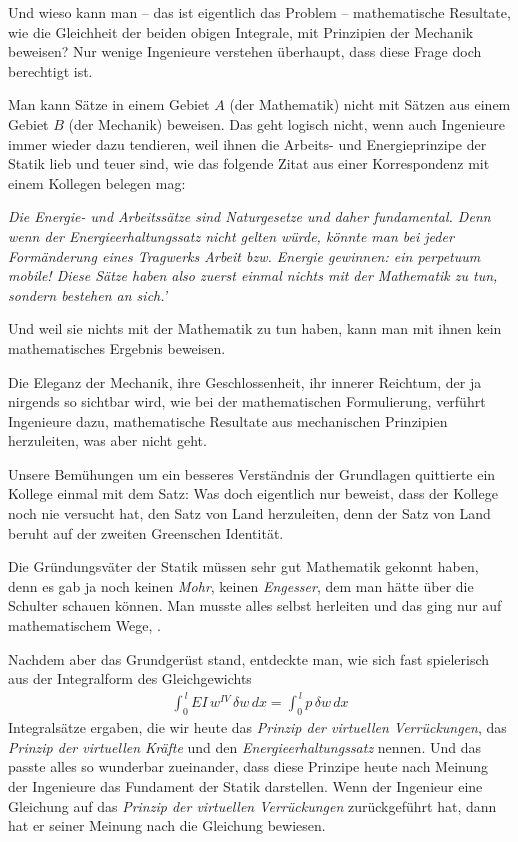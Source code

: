 Und wieso kann man -- das ist eigentlich das Problem -- mathematische Resultate, wie die Gleichheit der beiden obigen Integrale, mit Prinzipien der Mechanik beweisen? Nur wenige Ingenieure verstehen \"{u}berhaupt, dass diese Frage doch berechtigt ist.

Man kann S\"{a}tze in einem Gebiet $A$ (der Mathematik) nicht mit S\"{a}tzen aus einem Gebiet $B$ (der Mechanik) beweisen. Das geht logisch nicht, wenn auch Ingenieure immer wieder dazu tendieren, weil ihnen die Arbeits- und Energieprinzipe der Statik lieb und teuer sind, wie das folgende Zitat aus einer Korrespondenz mit einem Kollegen belegen mag:

{\em \glq Die Energie- und  Arbeitss\"{a}tze sind Naturgesetze und daher fundamental. Denn wenn der Energieerhaltungssatz nicht gelten w\"{u}rde, k\"{o}nnte man bei jeder Form\"{a}nderung eines Tragwerks Arbeit bzw. Energie gewinnen: ein perpetuum mobile! Diese S\"{a}tze haben also zuerst einmal nichts mit der Mathematik zu tun, sondern bestehen an sich.'\/}

Und weil sie nichts mit der Mathematik zu tun haben, kann man mit ihnen kein mathematisches Ergebnis beweisen.

Die Eleganz der Mechanik, ihre Geschlossenheit, ihr innerer Reichtum, der ja nirgends so sichtbar wird, wie bei der mathematischen Formulierung, verf\"{u}hrt Ingenieure dazu, mathematische Resultate aus mechanischen Prinzipien \glq herzuleiten\grq{}, was aber nicht geht.

Unsere Bem\"{u}hungen um ein besseres Verst\"{a}ndnis der Grundlagen quittierte ein Kollege einmal mit dem Satz:  Was doch eigentlich nur beweist, dass der Kollege noch nie versucht hat, den Satz von Land herzuleiten, denn der Satz von Land beruht auf der zweiten Greenschen Identit\"{a}t.

Die Gr\"{u}ndungsv\"{a}ter der Statik m\"{u}ssen sehr gut Mathematik gekonnt haben, denn es gab ja noch keinen {\em Mohr\/}, keinen {\em Engesser\/}, dem man h\"{a}tte \"{u}ber die Schulter schauen k\"{o}nnen. Man musste alles selbst herleiten und das ging nur auf mathematischem Wege, \cite{Ku}.

Nachdem aber das Grundger\"{u}st stand, entdeckte man, wie sich fast spielerisch aus der Integralform des Gleichgewichts
\begin{align}
\int_0^{\,l} EI\,w^{IV}\,\delta w\,dx = \int_0^{\,l} p\,\delta w\,dx
\end{align}
Integrals\"{a}tze ergaben, die wir heute das {\em Prinzip der virtuellen Verr\"{u}ckungen\/}, das {\em Prinzip der virtuellen Kr\"{a}fte\/} und den {\em Energieerhaltungssatz\/} nennen. Und das passte alles so wunderbar zueinander, dass diese Prinzipe heute nach Meinung der Ingenieure das Fundament der Statik darstellen. Wenn der Ingenieur eine Gleichung auf das {\em Prinzip der virtuellen Verr\"{u}ckungen\/} zur\"{u}ckgef\"{u}hrt hat, dann hat er seiner Meinung nach die Gleichung bewiesen.

